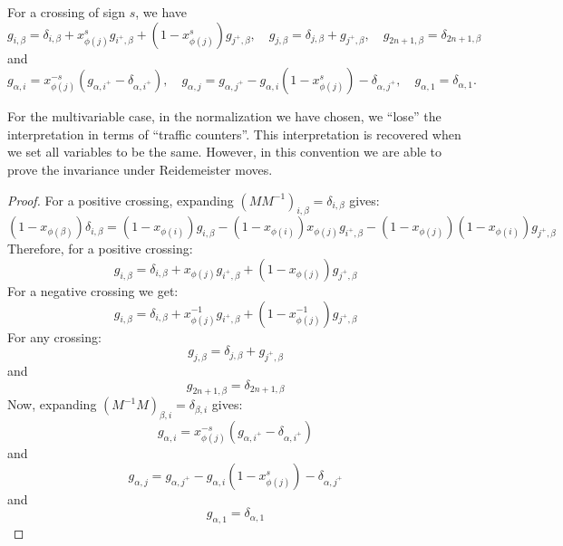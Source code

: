 \documentclass[11pt,e-only]{amsart}
\begin{document}
\begin{proposition} 
For a crossing of sign $s$, we have
\begin{equation}
    g_{i,\beta}=\delta_{i,\beta}+x_{\phi(j)}^sg_{i^+,\beta}+(1-x_{\phi(j)}^s)g_{j^+,\beta}, \hspace{1em} g_{j,\beta}=\delta_{j,\beta}+g_{j^+,\beta}, \hspace{1em} g_{2n+1,\beta}=\delta_{2n+1,\beta}
\end{equation}
and
\begin{equation}
    g_{\alpha,i}=x_{\phi(j)}^{-s}\left(g_{\alpha,i^+}-\delta_{\alpha,i^+}\right), \hspace{1em} g_{\alpha,j}=g_{\alpha,j^+}-g_{\alpha,i}(1-x_{\phi(j)}^s)-\delta_{\alpha,j^+}, \hspace{1em} g_{\alpha,1}=\delta_{\alpha,1}.
\end{equation}
\end{proposition}

\begin{remark} For the multivariable case, in the normalization we have chosen, we ``lose'' the interpretation in terms of ``traffic counters''. This interpretation is recovered when we set all variables to be the same. However, in this convention we are able to prove the invariance under Reidemeister moves.
\end{remark}

\begin{proof} For a positive crossing, expanding $(MM^{-1})_{i,\beta}=\delta_{i,\beta}$ gives:
\begin{equation}
    (1-x_{\phi(\beta)})\delta_{i,\beta}=(1-x_{\phi(i)})g_{i,\beta}-(1-x_{\phi(i)})x_{\phi(j)}g_{i^+,\beta}-(1-x_{\phi(j)})(1-x_{\phi(i)})g_{j^+,\beta}
\end{equation}
Therefore, for a positive crossing:
\begin{equation}
    g_{i,\beta}=\delta_{i,\beta}+x_{\phi(j)}g_{i^+,\beta}+(1-x_{\phi(j)})g_{j^+,\beta}
\end{equation}
For a negative crossing we get:
\begin{equation}
    g_{i,\beta}=\delta_{i,\beta}+x_{\phi(j)}^{-1}g_{i^+,\beta}+(1-x_{\phi(j)}^{-1})g_{j^+,\beta}
\end{equation}
For any crossing:
\begin{equation}
    g_{j,\beta}=\delta_{j,\beta}+g_{j^+,\beta}
\end{equation}
and
\begin{equation}
    g_{2n+1,\beta}=\delta_{2n+1,\beta}
\end{equation}
Now, expanding $(M^{-1}M)_{\beta,i}=\delta_{\beta,i}$ gives:
\begin{equation}
    g_{\alpha,i}=x_{\phi(j)}^{-s}\left(g_{\alpha,i^+}-\delta_{\alpha,i^+}\right)
\end{equation}
and
\begin{equation}
    g_{\alpha,j}=g_{\alpha,j^+}-g_{\alpha,i}(1-x_{\phi(j)}^s)-\delta_{\alpha,j^+}
\end{equation}
and
\begin{equation}
    g_{\alpha,1}=\delta_{\alpha,1}
\end{equation} 
\end{proof}
\end{document}
